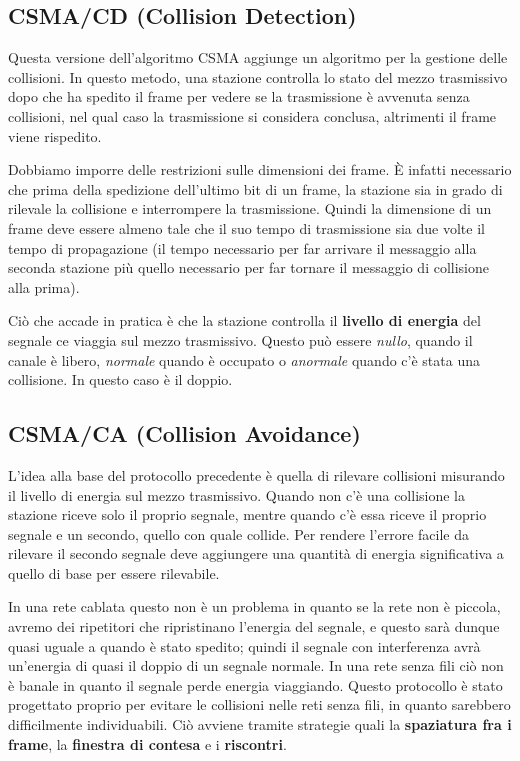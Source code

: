     \subsection{CSMA/CD (Collision Detection)}
        Questa versione dell'algoritmo CSMA aggiunge un algoritmo per la gestione delle collisioni. In questo metodo, una stazione controlla lo stato del mezzo trasmissivo dopo che ha spedito il frame per vedere se la trasmissione è avvenuta senza collisioni, nel qual caso la trasmissione si considera conclusa, altrimenti il frame viene rispedito.
        
        Dobbiamo imporre delle restrizioni sulle dimensioni dei frame. È infatti necessario che prima della spedizione dell'ultimo bit di un frame, la stazione sia in grado di rilevale la collisione e interrompere la trasmissione. Quindi la dimensione di un frame deve essere almeno tale che il suo tempo di trasmissione sia due volte il tempo di propagazione (il tempo necessario per far arrivare il messaggio alla seconda stazione più quello necessario per far tornare il messaggio di collisione alla prima).
        
        Ciò che accade in pratica è che la stazione controlla il \textbf{livello di energia} del segnale ce viaggia sul mezzo trasmissivo. Questo può essere \textit{nullo}, quando il canale è libero, \textit{normale} quando è occupato o \textit{anormale} quando c'è stata una collisione. In questo caso è il doppio.
        
    \subsection{CSMA/CA (Collision Avoidance)}
        L'idea alla base del protocollo precedente è quella di rilevare collisioni misurando il livello di energia sul mezzo trasmissivo. Quando non c'è una collisione la stazione riceve solo il proprio segnale, mentre quando c'è essa riceve il proprio segnale e un secondo, quello con quale collide. Per rendere l'errore facile da rilevare il secondo segnale deve aggiungere una quantità di energia significativa a quello di base per essere rilevabile.
        
        In una rete cablata questo non è un problema in quanto se la rete non è piccola, avremo dei ripetitori che ripristinano l'energia del segnale, e questo sarà dunque quasi uguale a quando è stato spedito; quindi il segnale con interferenza avrà un'energia di quasi il doppio di un segnale normale. In una rete senza fili ciò non è banale in quanto il segnale perde energia viaggiando. Questo protocollo è stato progettato proprio per evitare le collisioni nelle reti senza fili, in quanto sarebbero difficilmente individuabili. Ciò avviene tramite strategie quali la \textbf{spaziatura fra i frame}, la \textbf{finestra di contesa} e i \textbf{riscontri}.
        
